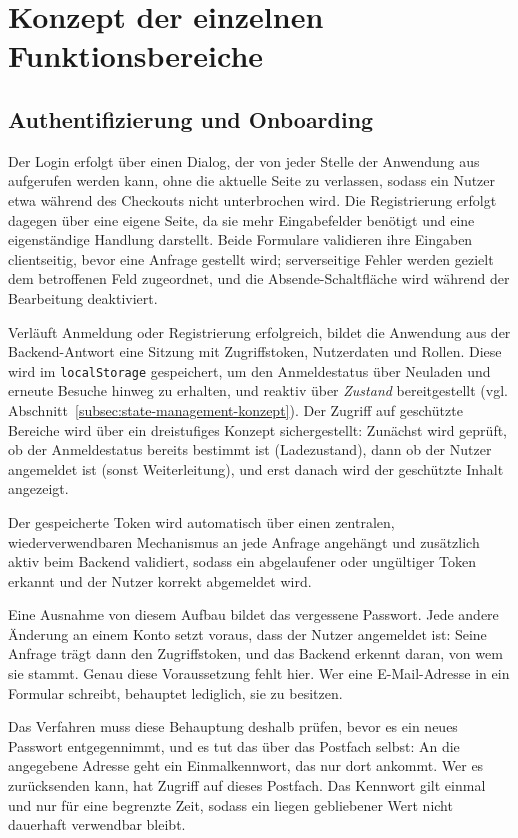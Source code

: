 \section{Konzept der einzelnen Funktionsbereiche}
\label{sec:funktionsbereiche_konzept}

\subsection{Authentifizierung und Onboarding}
\label{subsec:auth-onboarding}

Der Login erfolgt über einen Dialog, der von jeder Stelle der
Anwendung aus aufgerufen werden kann, ohne die aktuelle Seite zu
verlassen, sodass ein Nutzer etwa während des Checkouts nicht
unterbrochen wird. Die Registrierung erfolgt dagegen über eine eigene
Seite, da sie mehr Eingabefelder benötigt und eine eigenständige
Handlung darstellt. Beide Formulare validieren ihre Eingaben
clientseitig, bevor eine Anfrage gestellt wird; serverseitige Fehler
werden gezielt dem betroffenen Feld zugeordnet, und die
Absende-Schaltfläche wird während der Bearbeitung deaktiviert.

Verläuft Anmeldung oder Registrierung erfolgreich, bildet die
Anwendung aus der Backend-Antwort eine Sitzung mit Zugriffstoken,
Nutzerdaten und Rollen. Diese wird im \texttt{localStorage}
gespeichert, um den Anmeldestatus über Neuladen und erneute Besuche
hinweg zu erhalten, und reaktiv über \textit{Zustand} bereitgestellt
(vgl. Abschnitt~\ref{subsec:state-management-konzept}). Der Zugriff
auf geschützte Bereiche wird über ein dreistufiges Konzept
sichergestellt: Zunächst wird geprüft, ob der Anmeldestatus bereits
bestimmt ist (Ladezustand), dann ob der Nutzer angemeldet ist (sonst
Weiterleitung), und erst danach wird der geschützte Inhalt angezeigt.

Der gespeicherte Token wird automatisch über einen zentralen,
wiederverwendbaren Mechanismus an jede Anfrage angehängt und
zusätzlich aktiv beim Backend validiert, sodass ein abgelaufener oder
ungültiger Token erkannt und der Nutzer korrekt abgemeldet wird.

Eine Ausnahme von diesem Aufbau bildet das vergessene Passwort. Jede
andere Änderung an einem Konto setzt voraus, dass der Nutzer
angemeldet ist: Seine Anfrage trägt dann den Zugriffstoken, und das
Backend erkennt daran, von wem sie stammt. Genau diese Voraussetzung
fehlt hier. Wer eine E-Mail-Adresse in ein Formular schreibt,
behauptet lediglich, sie zu besitzen.

Das Verfahren muss diese Behauptung deshalb prüfen, bevor es ein
neues Passwort entgegennimmt, und es tut das über das Postfach
selbst: An die angegebene Adresse geht ein Einmalkennwort, das nur
dort ankommt. Wer es zurücksenden kann, hat Zugriff auf dieses
Postfach. Das Kennwort gilt einmal und nur für eine begrenzte Zeit,
sodass ein liegen gebliebener Wert nicht dauerhaft verwendbar bleibt.

